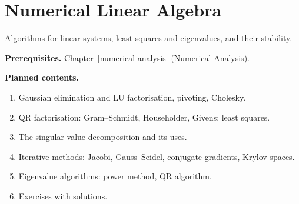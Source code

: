 \chapter{Numerical Linear Algebra}\label{numerical-linear-algebra}

Algorithms for linear systems, least squares and eigenvalues, and their stability.

\noindent\textbf{Prerequisites.} Chapter~\ref{numerical-analysis} (Numerical Analysis).

\noindent\textbf{Planned contents.}
\begin{enumerate}
\item Gaussian elimination and LU factorisation, pivoting, Cholesky.
\item QR factorisation: Gram--Schmidt, Householder, Givens; least squares.
\item The singular value decomposition and its uses.
\item Iterative methods: Jacobi, Gauss--Seidel, conjugate gradients, Krylov spaces.
\item Eigenvalue algorithms: power method, QR algorithm.
\item Exercises with solutions.
\end{enumerate}
